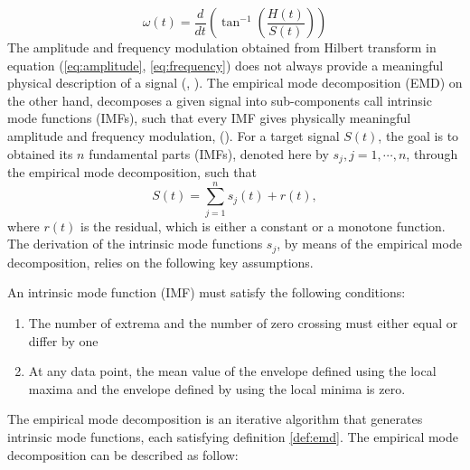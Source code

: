 \documentclass[../Main/thesis.tex]{subfiles}
\begin{document}
\begin{equation}\label{eq:frequency}
\omega(t) = \frac{d}{dt}\left(\tan^{-1}\left(\frac{H(t)}{S(t)} \right) \right)
\end{equation}
The amplitude and frequency modulation obtained from Hilbert transform in equation (\ref{eq:amplitude}, \ref{eq:frequency}) does not always provide a meaningful physical description of a signal (\cite{huang98}, \cite{huang08}).
 The empirical mode decomposition (EMD) on the other hand, decomposes a given signal into sub-components call intrinsic mode functions (IMFs), such that every IMF gives physically meaningful amplitude and frequency modulation, (\cite{huang98}).
 \justify
  For a target signal $S(t)$, the goal is to obtained its $n$ fundamental parts (IMFs), denoted here by $s_{j}, j =1,\cdots,n$, through the empirical mode decomposition, such that
\begin{equation}\label{eq:emd-decomposition}
S(t) = \sum_{j=1}^{n}s_{j}(t) + r(t),
\end{equation}
where $r(t)$ is the residual, which is either a constant or a monotone function. The derivation of the intrinsic mode functions $s_{j}$, by means of the empirical mode decomposition, relies on the following key assumptions.
\begin{definition}\label{def:emd}
An intrinsic mode function (IMF) must satisfy the following conditions:
\begin{enumerate}
\item The number of extrema and the number of zero crossing must either equal or differ by one 
\item At any data point, the mean value of the envelope defined using the local maxima and the envelope defined by using the local minima is zero.
\end{enumerate}
\end{definition}
The empirical mode decomposition is an iterative algorithm that generates intrinsic mode functions, each satisfying definition \ref{def:emd}.
\justify
The empirical mode decomposition can be described as follow:
\end{document}
